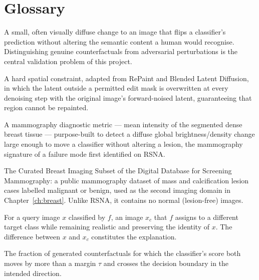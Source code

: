 \chapter*{Glossary}

\begin{description}[leftmargin=0pt,style=unboxed,itemsep=6pt]

\item[Adversarial perturbation] A small, often visually diffuse change to
an image that flips a classifier's prediction without altering the
semantic content a human would recognise. Distinguishing genuine
counterfactuals from adversarial perturbations is the central validation
problem of this project.

\item[Background lock] A hard spatial constraint, adapted from RePaint and
Blended Latent Diffusion, in which the latent outside a permitted edit
mask is overwritten at every denoising step with the original image's
forward-noised latent, guaranteeing that region cannot be repainted.

\item[BDC (Breast Density Contrast)] A mammography diagnostic metric ---
mean intensity of the segmented dense breast tissue --- purpose-built to
detect a diffuse global brightness/density change large enough to move a
classifier without altering a lesion, the mammography signature of a
failure mode first identified on RSNA.

\item[CBIS-DDSM] The Curated Breast Imaging Subset of the Digital Database
for Screening Mammography: a public mammography dataset of mass and
calcification lesion cases labelled malignant or benign, used as the
second imaging domain in Chapter~\ref{ch:breast}. Unlike RSNA, it contains
no normal (lesion-free) images.

\item[Counterfactual explanation] For a query image $x$ classified by $f$,
an image $x_c$ that $f$ assigns to a different target class while
remaining realistic and preserving the identity of $x$. The difference
between $x$ and $x_c$ constitutes the explanation.

\item[Counterfactual Validity (CV)] The fraction of generated
counterfactuals for which the classifier's score both moves by more than
a margin $\tau$ and crosses the decision boundary in the intended
direction.


\end{description}
